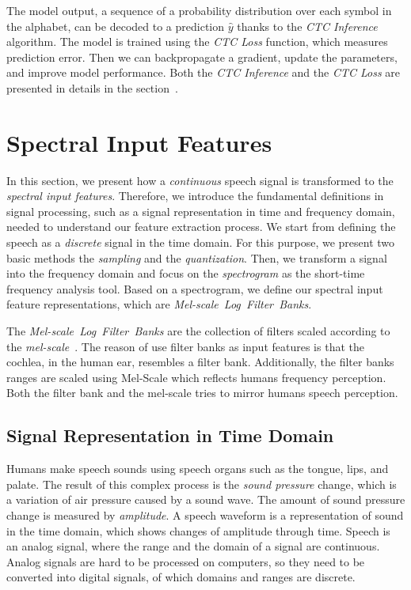 The model output, a sequence of a probability distribution over each symbol in the alphabet, can be
decoded to a prediction $\hat{y}$ thanks to the \textit{CTC Inference} algorithm.
The model is trained using the \textit{CTC Loss} function, which measures prediction error.
Then we can backpropagate a gradient, update the parameters, and improve model performance.
Both the \textit{CTC Inference} and the \textit{CTC Loss} are presented in details in the
section~.


\section{Spectral Input Features}\label{sec:spectral-input-features}

In this section, we present how a \textit{continuous} speech signal is transformed to
the \textit{spectral input features}.
Therefore, we introduce the fundamental definitions in signal processing,
such as a signal representation in time and frequency domain, needed to understand our feature extraction process.
We start from defining the speech as a \textit{discrete} signal in the time domain.
For this purpose, we present two basic methods the \textit{sampling} and the \textit{quantization}.
Then, we transform a signal into the frequency domain and focus on the \textit{spectrogram}
as the short-time frequency analysis tool.
Based on a spectrogram, we define our spectral input feature representations, which are
\textit{Mel-scale~Log~Filter~Banks}.

The \textit{Mel-scale~Log~Filter~Banks} are the collection of filters scaled
according to the \textit{mel-scale}~\cite{stevens1937}.
The reason of use filter banks as input features is that the cochlea,
in the human ear, resembles a filter bank.
Additionally, the filter banks ranges are scaled using Mel-Scale which reflects
humans frequency perception.
Both the filter bank and the mel-scale tries to mirror humans speech perception.


\subsection*{Signal Representation in Time Domain}

Humans make speech sounds using speech organs such as the tongue, lips, and palate.
The result of this complex process is the \textit{sound pressure} change,
which is a variation of air pressure caused by a sound wave.
The amount of sound pressure change is measured by \textit{amplitude}.
A speech waveform is a representation of sound in the time domain, which shows changes of amplitude through time.
Speech is an analog signal, where the range and the domain of a signal are continuous.
Analog signals are hard to be processed on computers, so they need to be converted into
digital signals, of which domains and ranges are discrete.

